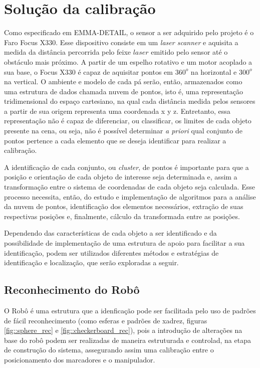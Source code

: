 \section{Solução da calibração}

Como especificado em EMMA-DETAIL, o sensor a ser adquirido pelo projeto é o Faro
Focus X330.
Esse dispositivo consiste em um \textit{laser scanner} e aquisita a medida da
distância percorrida pelo feixe $laser$ emitido pelo sensor até o obstáculo mais próximo. A partir de um
espelho rotativo e um motor acoplado a sua base, o Focus X330 é capaz de
aquisitar pontos em $360^o$ na horizontal e $300^o$ na vertical. O ambiente e
modelo de cada pá serão, então, armazenados como uma estrutura de dados chamada nuvem de
pontos, isto é, uma representação tridimensional do espaço cartesiano, na qual cada distância medida pelos
sensores a partir de sua origem representa uma coordenada x y z.
Entretanto, essa representação não é capaz de diferenciar, ou classificar, os
limites de cada objeto presente na cena, ou seja, não é possível determinar
\textit{a priori} qual conjunto de pontos pertence a cada elemento que se deseja
identificar para realizar a calibração.


A identificação de cada conjunto, ou \textit{cluster}, de pontos é importante
para que a posição e orientação de cada objeto de interesse seja determinada e,
assim a transformação entre o sistema de coordenadas de cada objeto seja
calculada. Esse processo necessita, então, do estudo e implementação de
algoritmos para a análise da nuvem de pontos, identificação dos elementos
necessários, extração de suas respectivas posições e, finalmente, cálculo da
transformada entre as posições.

Dependendo das características de cada objeto a ser identificado e da
possibilidade de implementação de uma estrutura de apoio para facilitar a sua
identificação, podem ser utilizados diferentes métodos e estratégias de
identificação e localização, que serão exploradas a seguir.

\subsection{Reconhecimento do Robô}

O Robô é uma estrutura que a idenficação pode ser facilitada pelo uso de
padrões de fácil reconhecimento (como esferas e padrões de xadrez, figuras
\ref{fig::sphere_rec} e \ref{fig::checkerboard_rec}), pois a
introdução de alterações na base do robô podem ser realizadas de maneira
estruturada e controlad, na etapa de construção do sistema, assegurando assim
uma calibração entre o posicionamento dos marcadores e o manipulador.


